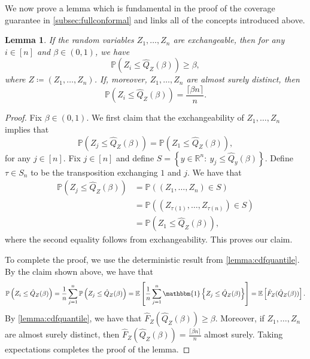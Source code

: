 \documentclass[11pt, titlepage]{article} %
\newcommand{\Prob}[1]{\mathbb{P}\left( #1 \right)}
\newcommand{\Exp}[3]{\mathbb{E}\left#2 #1 \right#3}
\newcommand{\Ind}[1]{\mathbbm{1}\left\{ #1 \right\}}
\numberwithin{equation}{section}
\newtheorem{lemma}{Lemma}
\theoremstyle{definition}
\numberwithin{theorem}{section}
\numberwithin{lemma}{section}
\numberwithin{corollary}{section}
\numberwithin{proposition}{section}
\numberwithin{definition}{section}
\numberwithin{remark}{section}
\begin{document}
\noindent
We now prove a lemma which is fundamental in the proof of the coverage guarantee in \cref{subsec:fullconformal} and links all of the concepts introduced above.

\begin{lemma}
    If the random variables \(Z_1, \ldots, Z_n\) are exchangeable, then for any \(i \in [n]\) and \(\beta \in (0,1)\), we have \[\Prob{Z_i \leq \hat{Q}_Z (\beta)} \geq \beta,\] where \(Z \coloneqq (Z_1, \ldots, Z_n)\). If, moreover, \(Z_1, \ldots, Z_n\) are almost surely distinct, then \[\Prob{Z_i \leq \hat{Q}_Z(\beta)} = \frac{\lceil{\beta n}\rceil}{n}.\]
\label{lemma:exch_cdfquantile}
\end{lemma}
\begin{proof}
    Fix \(\beta \in (0,1)\). We first claim that the exchangeability of \(Z_1, \ldots, Z_n\) implies that \[\Prob{Z_j \leq \hat{Q}_Z(\beta)} = \Prob{Z_1 \leq \hat{Q}_Z(\beta)}, \] for any \(j \in [n]\). Fix \(j \in [n]\) and define \(S = \left\{ y \in \mathbb{R}^n : \ y_j \leq \hat{Q}_y(\beta) \right\}.\) Define \(\tau \in S_n\) to be the transposition exchanging \(1\) and \(j\). We have that  
    \begin{align*}
        \Prob{Z_j \leq \hat{Q}_Z(\beta)} &= \Prob{(Z_1, \ldots, Z_n) \in S} \\
        &= \Prob{(Z_{\tau(1)}, \ldots, Z_{\tau(n)}) \in S} \\
        &= \Prob{Z_1 \leq \hat{Q}_Z(\beta)},
    \end{align*} where the second equality follows from exchangeability. This proves our claim. \vskip 5pt
    
    \noindent
    To complete the proof, we use the deterministic result from \cref{lemma:cdfquantile}. By the claim shown above, we have that \begin{align*}
        \Prob{Z_i \leq \hat{Q}_Z(\beta)} = \frac{1}{n} \sum_{j=1}^n \Prob{Z_j \leq \hat{Q}_Z(\beta)} = \mathbb{E} \left[ \frac{1}{n} \sum_{j=1}^n \Ind{Z_j \leq \hat{Q}_Z(\beta)} \right]
        = \Exp{\hat{F}_Z(\hat{Q}_Z(\beta))}{[}{]}.
    \end{align*} By \cref{lemma:cdfquantile}, we have that \(\hat{F}_Z(\hat{Q}_Z(\beta)) \geq \beta\). Moreover, if \(Z_1, \ldots, Z_n\) are almost surely distinct, then \(\hat{F}_Z(\hat{Q}_Z(\beta)) = \frac{\lceil{\beta n}\rceil}{n}\) almost surely. Taking expectations completes the proof of the lemma.
\end{proof}
\end{document}
